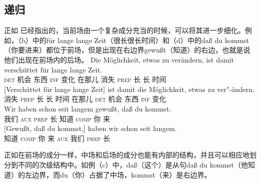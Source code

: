 \subsection{递归}
\label{sec-topo-rekursion}
正如 \citet[]{Reis80a}已经指出的，当前场由一个复杂成分充当的时候，可以将其进一步细化。例如，（b）中的für lange lange Zeit（很长很长时间）和（d）中的daß du kommst（你要进来）都位于前场，但是出现在右边界gewußt（知道）的右边，也就是说他们出现在前场内的后场。
\eal
\label{Beispiel-topologisch-komplexes-Vorfeld}
\ex
\gll Die Möglichkeit, etwas zu verändern, ist damit verschüttet für lange lange Zeit.\\
	 \textsc{det} 机会 东西 \textsc{inf} 变化 \passiveprs{} 在那儿 消失 \textsc{prep} 长 长 时间\\
\ex 
\gll {}[Verschüttet für lange lange Zeit] ist damit die Möglichkeit,      etwas zu ver"-ändern.\\
      \spacebr{}消失 \textsc{prep} 长 长 时间 \passiveprs{} 在那儿 \textsc{det} 机会  东西 \textsc{inf} 变化\\
\ex 
\gll Wir haben        schon       seit          langem gewußt, daß du kommst.\\
     我们 \textsc{aux} \particle{} \textsc{prep} 长     知道     \textsc{comp} 你 来\\
\ex 
\gll {}[Gewußt, daß du kommst,] haben wir schon seit langem.\\
	 \spacebr{}知道 \textsc{comp} 你 来 \textsc{aux} 我们 \particle{} \textsc{prep} 长\\
\zl


\noindent
正如在前场的成分一样，中场和后场的成分也能有内部的结构，并且可以相应地划分到不同的次级结构中。如例（c）中，daß（这个）是从句daß du kommst（他知道）的左边界，而du（你）占据了中场，kommst（来）是右边界。


